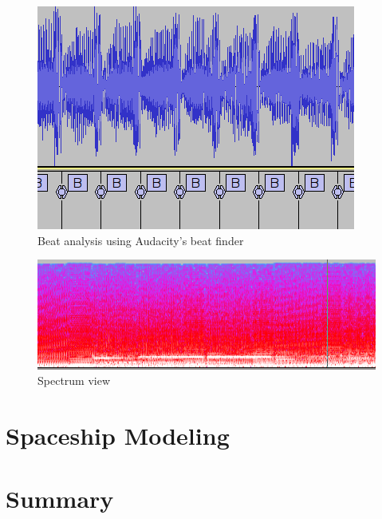 \documentclass[a4paper, 12pt]{scrartcl}
\begin{document}
    \begin{figure}[H]
        \centering
        \includegraphics{audacity_beat}
        \caption{Beat analysis using Audacity's beat finder}
    \end{figure}

    \begin{figure}[H]
        \centering
        \includegraphics{audacity_spectrum}
        \caption{Spectrum view}
    \end{figure}

    \section{Spaceship Modeling}

    \section{Summary}
\end{document}
